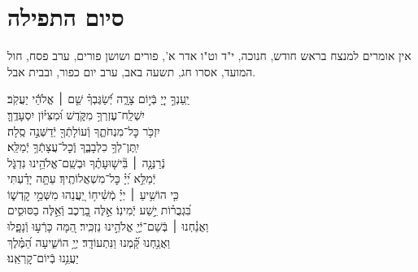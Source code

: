 \documentclass[twoside, openany, parskip=half, 11pt]{book}
\begin{document}
\hagbaha

\nextpage

\galila

\yehalelu

\negline
\kafdalet


\etzchaim






\section[סיום התפילה]{ סיום התפילה }
\label{ashrei}
\ashrei

\begin{scriptsize} %
\textsf{
אין אומרים למנצח בראש חודש, חנוכה, י"ד וט"ו אדר א', פורים ושושן פורים,
ערב פסח, חול המועד, אסרו חג, תשעה באב, ערב יום כפור, ובבית אבל.}

\end{scriptsize}

\begin{narrow}
\hfill \break
יַֽעַנְךָ֣ יְיָ֭ בְּֿי֣וֹם צָרָ֑ה \hfill יְֿ֝שַׂגֶּבְךָ֗ שֵׁ֤ם ׀ אֱלֹהֵ֬י יַעֲקֹֽב׃ \\
יִשְׁלַֽח־עֶזְרְךָ֥ מִקֹּ֑דֶשׁ \hfill וּ֝מִצִּיּ֗וֹן יִסְעָדֶֽךָּ׃ \\
יִזְכֹּ֥ר כׇּל־מִנְחֹתֶ֑ךָ \hfill וְֿעוֹלָתְֿךָ֖ יְֿדַשְּׁנֶ֣ה סֶֽלָה׃ \\
יִֽתֶּן־לְךָ֥ כִלְבָבֶ֑ךָ \hfill וְֽֿכׇל־עֲצָתְֿךָ֥ יְֿמַלֵּֽא׃ \\
נְֿרַנְּנָ֤ה ׀ בִּ֘ישׁ֤וּעָתֶ֗ךָ \hfill וּבְשֵֽׁם־אֱלֹהֵ֥ינוּ נִדְגֹּ֑ל \\ יְֿמַלֵּ֥א יְ֝יָ֗ כׇּל־מִשְׁאֲלוֹתֶֽיךָ׃ \hfill
עַתָּ֤ה יָדַ֗עְתִּי\\ כִּ֤י הוֹשִׁ֥יעַ ׀ יְיָ֗ מְֿשִׁ֫יח֥וֹ \hfill יַ֭עֲנֵהוּ מִשְּׁמֵ֣י קׇדְשׁ֑וֹ\\ בִּ֝גְבֻר֗וֹת יֵ֣שַׁע יְֿמִינֽוֹ׃ \hfill
אֵ֣לֶּה בָ֭רֶכֶב וְֿאֵ֣לֶּה בַסּוּסִ֑ים\\ וַאֲנַ֓חְנוּ ׀ בְּֿשֵׁם־יְֿיָ֖ אֱלֹהֵ֣ינוּ נַזְכִּֽיר׃ \hfill
הֵ֭מָּה כָּרְֿע֣וּ וְֿנָפָ֑לוּ \\ וַאֲנַ֥חְנוּ קַּ֝֗מְנוּ וַנִּתְעוֹדָֽד׃ \hfill
יְיָ֥ הוֹשִׁ֑יעָה הַ֝מֶּ֗לֶךְ\\ יַעֲנֵ֥נוּ בְֿיוֹם־קׇרְאֵֽנוּ׃ \hfill \break

\end{narrow}
\end{document}
